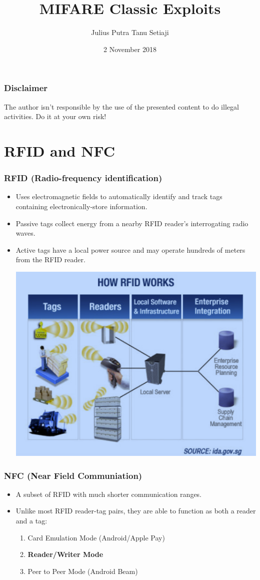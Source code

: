 \documentclass[12pt]{beamer}
\title{MIFARE Classic Exploits}
\author{Julius Putra Tanu Setiaji}
\date{2 November 2018}
\begin{document}
	\frame{\titlepage}

\begin{frame}
\frametitle{Disclaimer}
The author isn't responsible by the use of the presented content to do illegal activities. Do it at your own risk! 
\end{frame}
	
\section{RFID and NFC}

\begin{frame}
\frametitle{RFID (Radio-frequency identification)}
\begin{itemize}
	\item Uses electromagnetic fields to automatically identify and track tags containing electronically-store information.
	\item Passive tags collect energy from a nearby RFID reader's interrogating radio waves.
	\item Active tags have a local power source and may operate hundreds of meters from the RFID reader.
	\begin{center}
		\includegraphics[width=0.5\linewidth]{rfid}
	\end{center}
\end{itemize}
\end{frame}

\begin{frame}
\frametitle{NFC (Near Field Communiation)}
\begin{itemize}
	\item A subset of RFID with much shorter communication ranges.
	\item Unlike most RFID reader-tag pairs, they are able to function as both a reader and a tag:
	\begin{enumerate}
		\item Card Emulation Mode (Android/Apple Pay)
		\item \textbf{Reader/Writer Mode}
		\item Peer to Peer Mode (Android Beam)
	\end{enumerate}
\end{itemize}
\end{frame}
\end{document}
